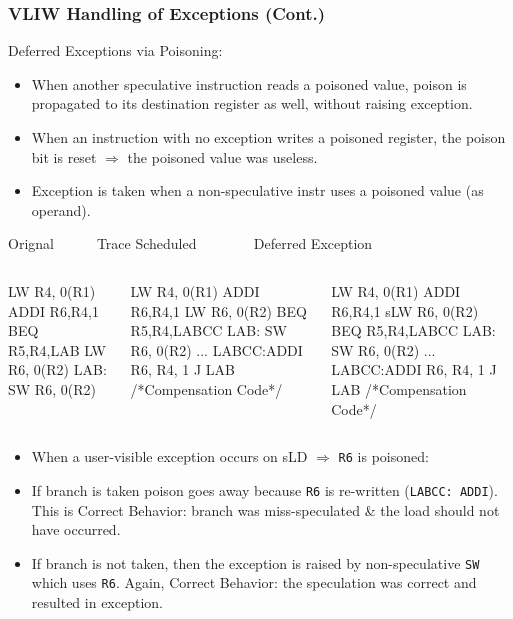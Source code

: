 \documentclass{beamer}
\renewcommand{\emph}[1]{\textcolor{structure}{#1}}
\newcommand{\emp}[1]{\textcolor{DikuRed}{ #1}}
\begin{document}
\begin{frame}[fragile,t]
    \frametitle{VLIW Handling of Exceptions (Cont.)}

Deferred Exceptions via Poisoning:
\begin{scriptsize}
\begin{itemize}
    \item When another speculative instruction reads a poisoned value, poison
            is propagated to its destination register as well, without raising 
            exception.\smallskip
    \item When an instruction with no exception writes a poisoned register,
            the poison bit is reset $\Rightarrow$ the poisoned value
            was useless.\smallskip
    \item \emp{Exception is taken when a non-speculative instr 
                uses a poisoned value (as operand)}.
\end  {itemize}
\end{scriptsize}


\smallskip

\begin{block}{Orignal{\tt~~~~~~}Trace Scheduled{\tt~~~~~~~~}Deferred Exception}\vspace{-1ex}
\begin{columns}
\begin{colorcode}[fontsize=\tiny]
      LW   R4, 0(R1)
      ADDI R6,R4,1
      BEQ  R5,R4,LAB
      LW   R6, 0(R2)
LAB:  SW   R6, 0(R2) 
\end{colorcode}
\begin{colorcode}[fontsize=\tiny]
      LW   R4, 0(R1)
      ADDI R6,R4,1
      \alert{LW   R6, 0(R2)}
      BEQ  R5,R4,LABCC
LAB:  SW   R6, 0(R2) 
...
LABCC:ADDI R6, R4, 1
      J    LAB
/*Compensation Code*/
\end{colorcode}
\begin{colorcode}[fontsize=\tiny]
      LW   R4, 0(R1)
      ADDI R6,R4,1
      \emp{sLW  R6, 0(R2)}
      BEQ  R5,R4,LABCC
LAB:  \emph{SW   R6, 0(R2)} 
...
\emph{LABCC:ADDI R6, R4, 1}
      J    LAB
/*Compensation Code*/
\end{colorcode}
\end{columns}
\end{block}
\pause

\begin{scriptsize}
\begin{itemize}
    \item When a user-visible exception occurs on \emp{sLD} $\Rightarrow$ {\tt R6} is poisoned:\smallskip
    \item If branch is taken poison goes away because {\tt R6} is re-written 
            ({\tt LABCC: ADDI}). \emph{This is Correct Behavior}: branch
            was miss-speculated \& the load should not have occurred. 
    \item If branch is not taken, then the exception is raised by non-speculative
            {\tt SW} which uses {\tt R6}. \emph{Again, Correct Behavior}:
            the speculation was correct and resulted in exception.
\end  {itemize}
\end{scriptsize}


\end{frame}
\end{document}
